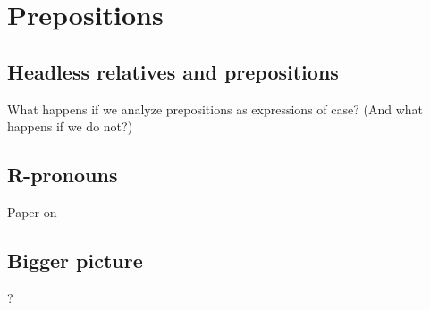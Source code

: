 
\chapter{Prepositions}

  \section{Headless relatives and prepositions}
What happens if we analyze prepositions as expressions of case? (And what happens if we do not?)

  \section{R-pronouns}
Paper on 

  \section{Bigger picture}
?
